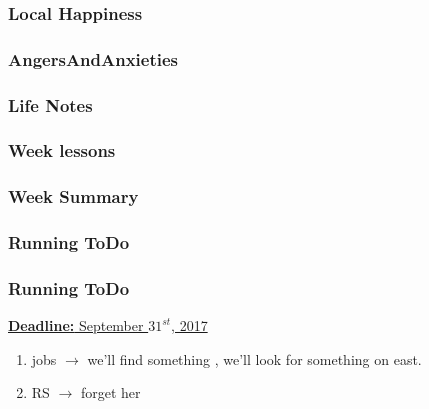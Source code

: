 \begin{frame}
\frametitle{Local Happiness}
\end{frame}


\begin{frame} 
\frametitle{AngersAndAnxieties}

\end{frame}

\begin{frame}
\frametitle{Life Notes}
\end{frame}

\begin{frame}
\frametitle{Week lessons} 
\end{frame}

\begin{frame}
\frametitle{Week Summary}
\end{frame}


\begin{frame}
\frametitle{Running ToDo}
\end{frame}

\begin{frame} 
\frametitle{Running ToDo} 
\end{frame}

\underline{\textbf{Deadline:} September $31^{st}$, 2017} 
\begin{enumerate}

\item jobs $\rightarrow$ we'll find something , we'll look for something on east. 

\item RS $\rightarrow$ forget her 

\end{enumerate} 

